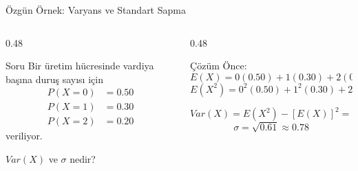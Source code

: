 \documentclass[light]{lutbeamer}
\begin{document}
\begin{frame}{Özgün Örnek: Varyans ve Standart Sapma}
\small
\begin{columns}[T,onlytextwidth]
    \begin{column}{0.48\textwidth}
        \begin{block}{Soru}
            Bir üretim hücresinde vardiya başına duruş sayısı için
            \[
            \begin{aligned}
            P(X=0)&=0.50 \\
            P(X=1)&=0.30 \\
            P(X=2)&=0.20
            \end{aligned}
            \]
            veriliyor.

            \vspace{0.15cm}
            $Var(X)$ ve $\sigma$ nedir?
        \end{block}
    \end{column}
    \begin{column}{0.48\textwidth}
        \begin{exampleblock}{Çözüm}
            Önce:
            \[
            E(X)=0(0.50)+1(0.30)+2(0.20)=0.70
            \]
            \[
            E(X^2)=0^2(0.50)+1^2(0.30)+2^2(0.20)=1.10
            \]

            \[
            Var(X)=E(X^2)-[E(X)]^2=1.10-0.49=0.61
            \]
            \[
            \sigma=\sqrt{0.61}\approx 0.78
            \]
        \end{exampleblock}
    \end{column}
\end{columns}
\end{frame}
\end{document}
